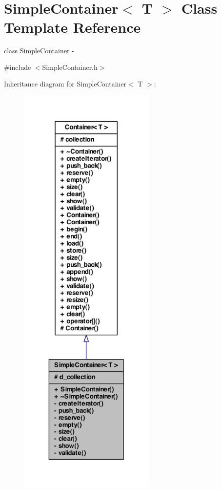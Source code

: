 \hypertarget{class_simple_container}{
\section{SimpleContainer$<$ T $>$ Class Template Reference}
\label{class_simple_container}
}


class \hyperlink{class_simple_container}{SimpleContainer} -\/  




{\ttfamily \#include $<$SimpleContainer.h$>$}



Inheritance diagram for SimpleContainer$<$ T $>$:
\nopagebreak
\begin{figure}[H]
\begin{center}
\leavevmode
\includegraphics[height=600pt]{class_simple_container__inherit__graph}
\end{center}
\end{figure}


